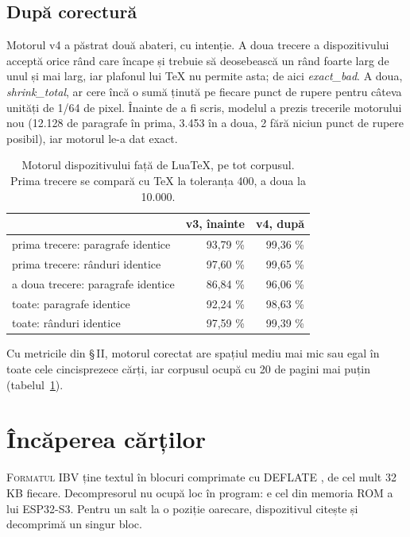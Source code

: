 \documentclass[11pt,a4paper,oneside]{article}
\newcommand\lin{\addfontfeatures{Numbers={Lining,Monospaced}}}
\begin{document}
\subsection{După corectură}
Motorul v4 a păstrat două abateri, cu intenție. A doua trecere a dispozitivului
acceptă orice rând care încape și trebuie să deosebească un rând foarte larg de
unul și mai larg, iar plafonul lui TeX nu permite asta; de aici
\textit{exact\_bad}. A doua, \textit{shrink\_total}, ar cere încă o sumă ținută
pe fiecare punct de rupere pentru câteva unități de 1/64 de pixel. Înainte de a
fi scris, modelul a prezis trecerile motorului nou (12.128 de paragrafe în prima,
3.453 în a doua, 2 fără niciun punct de rupere posibil), iar motorul le-a dat
exact.

\begin{table}[t]
\centering\small
\caption{Motorul dispozitivului față de LuaTeX, pe tot corpusul. Prima trecere
se compară cu TeX la toleranța 400, a doua la 10.000.}
\label{tab:texref}
\lin
\begin{tabular}{@{}lrr@{}}
\toprule
& v3, înainte & v4, după \\
\midrule
prima trecere: paragrafe identice & 93,79 \% & 99,36 \% \\
prima trecere: rânduri identice & 97,60 \% & 99,65 \% \\
a doua trecere: paragrafe identice & 86,84 \% & 96,06 \% \\
toate: paragrafe identice & 92,24 \% & 98,63 \% \\
toate: rânduri identice & 97,59 \% & 99,39 \% \\
\bottomrule
\end{tabular}
\end{table}

Cu metricile din §\,II, motorul corectat are spațiul mediu mai mic sau egal în
toate cele cincisprezece cărți, iar corpusul ocupă cu 20 de pagini mai puțin
(tabelul~\ref{tab:texref}).

\section{Încăperea cărților}

\lettrine{F}{ormatul IBV} ține textul în blocuri comprimate cu DEFLATE
\cite{rfc1951}, de cel mult 32 KB fiecare. Decompresorul nu ocupă loc în
program: e cel din memoria ROM a lui ESP32-S3. Pentru un salt la o poziție
oarecare, dispozitivul citește și decomprimă un singur bloc.
\end{document}

